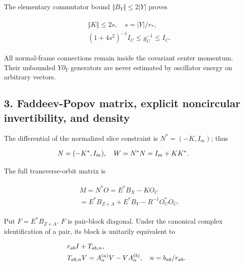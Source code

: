 The elementary commutator bound \(\Vert B_{Y}\Vert \le 2\vert Y\vert\)
proves

\begin{gather*}
\begin{aligned}
& \Vert K\Vert \le 2s, \quad  s=\vert Y\vert /r_{*}, \\
& (1+4s^{2})^{-1} I_{C} \le  g_{C}^{-1} \le  I_{C}.
\end{aligned}\tag{6}
\end{gather*}

All normal-frame connections remain inside the covariant center
momentum. Their unbounded \(Y \partial _{Y}\) generators are never
estimated by oscillator energy on arbitrary vectors.

\subsection{3. Faddeev-Popov matrix, explicit noncircular invertibility,
and
density}\label{a-faddeev-popov-matrix-explicit-noncircular-invertibility-and-density}

The differential of the normalized slice constraint is
\(N^{*}=(-K,I_{m})\); thus

\begin{gather*}
\begin{aligned}
& N=(-K^{*},I_{m}), \quad  W=N^{*}N=I_{m}+K K^{*}.
\end{aligned}\notag
\end{gather*}

The full transverse-orbit matrix is

\begin{gather*}
\begin{aligned}
& M=N^{*}O=E^{*}B_{X}-K O_{C} \\
& =E^{*}B_{Z+A}+E^{*}B_{Y}-R^{-1}O_{C}^{*}O_{C}.
\end{aligned}\tag{7}
\end{gather*}

Put \(F=E^{*}B_{Z+A}\). \(F\) is pair-block diagonal. Under the
canonical complex identification of a pair, its block is unitarily
equivalent to

\begin{gather*}
\begin{aligned}
& r_{ab} I+T_{ab,n}, \\
& T_{ab,n} V=A_{n}^{(a)}V-V A_{n}^{(b)}, \quad  n=b_{ab}/r_{ab}.
\end{aligned}\notag
\end{gather*}


